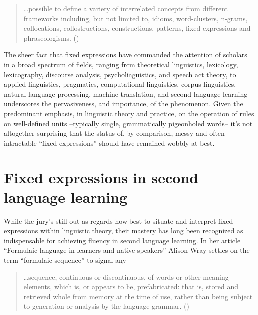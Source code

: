 \documentclass[output=paper]{langsci/langscibook}
\begin{document}
\begin{quote}
    …possible to define a variety of interrelated concepts from different frameworks including, but not limited to, idioms, word-clusters, n-grams, collocations, collostructions, constructions, patterns, fixed expressions and phraseologisms. (\citealt[21]{granger_phraseology_2008})
\end{quote}

The sheer fact that fixed expressions have commanded the attention of scholars in a broad spectrum of fields, ranging from theoretical linguistics, lexicology, lexicography, discourse analysis, psycholinguistics, and speech act theory, to applied linguistics, pragmatics, computational linguistics, corpus linguistics, natural language processing, machine translation, and second language learning underscores the pervasiveness, and importance, of the phenomenon. Given the predominant emphasis, in linguistic theory and practice, on the operation of rules on well-defined units –typically single, grammatically pigeonholed words– it’s not altogether surprising that the status of, by comparison, messy and often intractable ``fixed expressions'' should have remained wobbly at best. 

\section{Fixed expressions in second language learning}

While the jury’s still out as regards how best to situate and interpret fixed expressions within linguistic theory, their mastery has long been recognized as indispensable for achieving fluency in second language learning. In her article “Formulaic language in learners and native speakers” Alison Wray settles on the term ``formulaic sequence'' to signal any 

\begin{quote}
    …sequence, continuous or discontinuous, of words or other meaning elements, which is, or appears to be, prefabricated: that is, stored and retrieved whole from memory at the time of use, rather than being subject to generation or analysis by the language grammar. (\citeyear[214]{wray_formulaic_1999})  
\end{quote}
\end{document}
